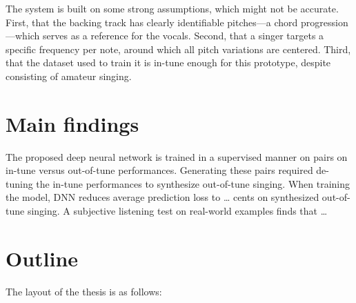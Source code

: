 The system is built on some strong assumptions, which might not be accurate. First, that the backing track has clearly identifiable pitches---a chord progression---which serves as a reference for the vocals. Second, that a singer targets a specific frequency per note, around which all pitch variations are centered. Third, that the dataset used to train it is in-tune enough for this prototype, despite consisting of amateur singing. %
\section{Main findings}
The proposed deep neural network is trained in a supervised manner on pairs on in-tune versus out-of-tune performances. Generating these pairs required de-tuning the in-tune performances to synthesize out-of-tune singing. When training the model, DNN reduces average prediction loss to … cents on synthesized out-of-tune singing. A subjective listening test on real-world examples finds that … 

\section{Outline}
The layout of the thesis is as follows:

